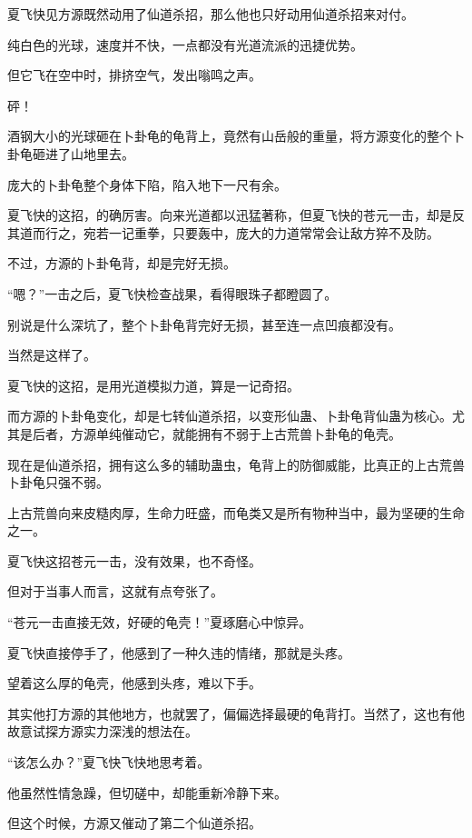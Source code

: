 
\begin{this_body}

夏飞快见方源既然动用了仙道杀招，那么他也只好动用仙道杀招来对付。

纯白色的光球，速度并不快，一点都没有光道流派的迅捷优势。

但它飞在空中时，排挤空气，发出嗡鸣之声。

砰！

酒钢大小的光球砸在卜卦龟的龟背上，竟然有山岳般的重量，将方源变化的整个卜卦龟砸进了山地里去。

庞大的卜卦龟整个身体下陷，陷入地下一尺有余。

夏飞快的这招，的确厉害。向来光道都以迅猛著称，但夏飞快的苍元一击，却是反其道而行之，宛若一记重拳，只要轰中，庞大的力道常常会让敌方猝不及防。

不过，方源的卜卦龟背，却是完好无损。

“嗯？”一击之后，夏飞快检查战果，看得眼珠子都瞪圆了。

别说是什么深坑了，整个卜卦龟背完好无损，甚至连一点凹痕都没有。

当然是这样了。

夏飞快的这招，是用光道模拟力道，算是一记奇招。

而方源的卜卦龟变化，却是七转仙道杀招，以变形仙蛊、卜卦龟背仙蛊为核心。尤其是后者，方源单纯催动它，就能拥有不弱于上古荒兽卜卦龟的龟壳。

现在是仙道杀招，拥有这么多的辅助蛊虫，龟背上的防御威能，比真正的上古荒兽卜卦龟只强不弱。

上古荒兽向来皮糙肉厚，生命力旺盛，而龟类又是所有物种当中，最为坚硬的生命之一。

夏飞快这招苍元一击，没有效果，也不奇怪。

但对于当事人而言，这就有点夸张了。

“苍元一击直接无效，好硬的龟壳！”夏琢磨心中惊异。

夏飞快直接停手了，他感到了一种久违的情绪，那就是头疼。

望着这么厚的龟壳，他感到头疼，难以下手。

其实他打方源的其他地方，也就罢了，偏偏选择最硬的龟背打。当然了，这也有他故意试探方源实力深浅的想法在。

“该怎么办？”夏飞快飞快地思考着。

他虽然性情急躁，但切磋中，却能重新冷静下来。

但这个时候，方源又催动了第二个仙道杀招。


\end{this_body}

